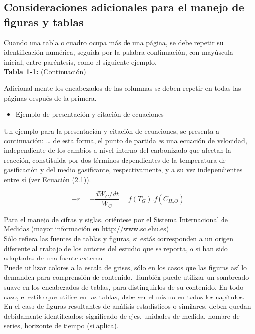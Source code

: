 \subsection{Consideraciones adicionales para el manejo de figuras y tablas}

Cuando una tabla o cuadro ocupa más de una página, se debe repetir su identificación numérica, seguida por la palabra continuación, con mayúscula inicial, entre paréntesis, como el siguiente ejemplo.\\

\textbf{Tabla 1-1:} 	(Continuación)

Adicional mente los encabezados de las columnas se deben repetir en todas las páginas después de la primera. 

\begin{itemize}
\item Ejemplo de presentación y citación de ecuaciones
\end{itemize}  

Un ejemplo para la presentación y citación de ecuaciones, se presenta a continuación: … de esta forma, el punto de partida es una ecuación de velocidad, independiente de los cambios a nivel interno del carbonizado que afectan la reacción, constituida por dos términos dependientes de la temperatura de gasificación y del medio gasificante, respectivamente, y a su vez independientes entre sí (ver Ecuación (2.1)).

\begin{equation}
-r=-\frac{dW_C/dt}{W_C}=f\left(T_G\right).f(C_{H_2O})
\end{equation}

Para el manejo de cifras y siglas, oriéntese por el Sistema Internacional de Medidas (mayor información en http://www.sc.ehu.es)\\ 

Sólo refiera las fuentes de tablas y figuras, si estás corresponden a un origen diferente al trabajo de los autores del estudio que se reporta, o si han sido adaptadas de una fuente externa. \\

Puede utilizar colores a la escala de grises, sólo en los casos que las figuras así lo demanden para comprensión de contenido. También puede utilizar un sombreado suave en los encabezados de tablas, para distinguirlos de su contenido. En todo caso, el estilo que utilice en las tablas, debe ser el mismo en todos los capítulos.\\ 

En el caso de figuras resultantes de análisis estadísticos o similares, deben quedan debidamente identificados: significado de ejes, unidades de medida, nombre de series, horizonte de tiempo (si aplica).\\

